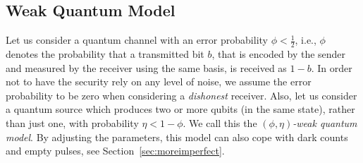 \subsection{Weak Quantum Model}
 
Let us consider a quantum channel with an error probability $\phi <
\frac{1}{2}$, i.e., $\phi$ denotes the probability that a transmitted
bit $b$, that is encoded by the sender and measured by the receiver
using the same basis, is received as $1-b$. In order not to have the
security rely on any level of noise, we assume 
the error probability to be zero when considering a {\em dishonest} receiver.
Also, let us consider a quantum source which produces two or more
qubits (in the same state), rather than just one, with probability
$\eta < 1 - \phi$.
We call this the \emph{$(\phi,\eta)$-weak quantum model}. By adjusting the
parameters, this model can also cope with dark counts and empty
pulses, see Section~\ref{sec:moreimperfect}.
 

